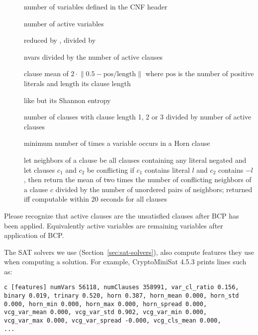 \begin{description}
\item[] number of variables defined in the CNF header
\item[] number of active variables
\item[]  reduced by , divided by 
\item[] nvars divided by the number of active clauses
\item[] clause mean of $2 \cdot \left\| 0.5 - {\text{pos}}/{\text{length}}\right\|$ where $\text{pos}$ is the number of positive literals and $\text{length}$ its clause length
\item[] like  but its Shannon entropy
\item[] number of clauses with clause length 1, 2 or 3 divided by number of active clauses
\item[] minimum number of times a variable occurs in a Horn clause
\item[]
   let neighbors of a clause be all clauses containing any literal negated
   and let clauses $c_1$ and $c_2$ be conflicting if $c_1$ contains literal $l$ and $c_2$ contains $-l$,
   then return the mean of two times the number of conflicting neighbors of a clause $c$
   divided by the number of unordered pairs of neighbors;
   returned iff computable within 20 seconds for all clauses
\end{description}

Please recognize that active clauses are the unsatisfied clauses after BCP has been applied.
Equivalently active variables are remaining variables after application of BCP.

The SAT solvers we use (Section~\ref{sec:sat-solvers}), also compute features they use
when computing a solution. For example, CryptoMiniSat 4.5.3 prints lines such as:

\begin{verbatim}
c [features] numVars 56118, numClauses 358991, var_cl_ratio 0.156,
binary 0.019, trinary 0.520, horn 0.387, horn_mean 0.000, horn_std
0.000, horn_min 0.000, horn_max 0.000, horn_spread 0.000,
vcg_var_mean 0.000, vcg_var_std 0.902, vcg_var_min 0.000,
vcg_var_max 0.000, vcg_var_spread -0.000, vcg_cls_mean 0.000,
...
\end{verbatim}

